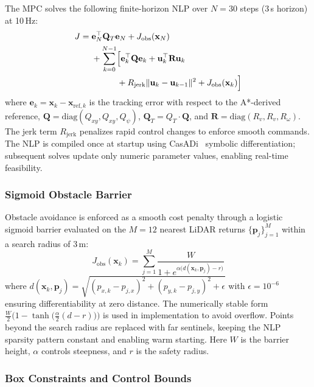 \documentclass[conference]{IEEEtran}
\begin{document}
The MPC solves the following finite-horizon NLP over $N = 30$ steps (3\,s horizon) at 10\,Hz:
\begin{align}
	J =\; & \mathbf{e}_N^\top \mathbf{Q}_T \mathbf{e}_N + J_{\text{obs}}(\mathbf{x}_N) \nonumber                                      \\
	      & + \sum_{k=0}^{N-1} \Bigl[ \mathbf{e}_k^\top \mathbf{Q} \mathbf{e}_k + \mathbf{u}_k^\top \mathbf{R} \mathbf{u}_k \nonumber \\
	      & \qquad\quad + R_{\text{jerk}} \|\mathbf{u}_k - \mathbf{u}_{k-1}\|^2 + J_{\text{obs}}(\mathbf{x}_k) \Bigr]
	\label{eq:mpc-cost}
\end{align}
where $\mathbf{e}_k = \mathbf{x}_k - \mathbf{x}_{\text{ref},k}$ is the tracking error with respect to the A*-derived reference, $\mathbf{Q} = \text{diag}(Q_{xy}, Q_{xy}, Q_\psi)$, $\mathbf{Q}_T = Q_T \cdot \mathbf{Q}$, and $\mathbf{R} = \text{diag}(R_v, R_v, R_\omega)$. The jerk term $R_{\text{jerk}}$ penalizes rapid control changes to enforce smooth commands. The NLP is compiled once at startup using CasADi~\cite{@TODO} symbolic differentiation; subsequent solves update only numeric parameter values, enabling real-time feasibility.

\subsubsection{Sigmoid Obstacle Barrier}

Obstacle avoidance is enforced as a smooth cost penalty through a logistic sigmoid barrier evaluated on the $M = 12$ nearest LiDAR returns $\{\mathbf{p}_j\}_{j=1}^M$ within a search radius of 3\,m:
\begin{equation}
	J_{\text{obs}}(\mathbf{x}_k) = \sum_{j=1}^{M} \frac{W}{1 + e^{\alpha\bigl(d(\mathbf{x}_k, \mathbf{p}_j) - r\bigr)}}
	\label{eq:barrier}
\end{equation}
where $d(\mathbf{x}_k, \mathbf{p}_j) = \sqrt{(p_{x,k} - p_{j,x})^2 + (p_{y,k} - p_{j,y})^2 + \epsilon}$ with $\epsilon = 10^{-6}$ ensuring differentiability at zero distance. The numerically stable form $\frac{W}{2}\bigl(1 - \tanh\!\bigl(\frac{\alpha}{2}(d - r)\bigr)\bigr)$ is used in implementation to avoid overflow. Points beyond the search radius are replaced with far sentinels, keeping the NLP sparsity pattern constant and enabling warm starting. Here $W$ is the barrier height, $\alpha$ controls steepness, and $r$ is the safety radius.

\subsubsection{Box Constraints and Control Bounds}
\end{document}
